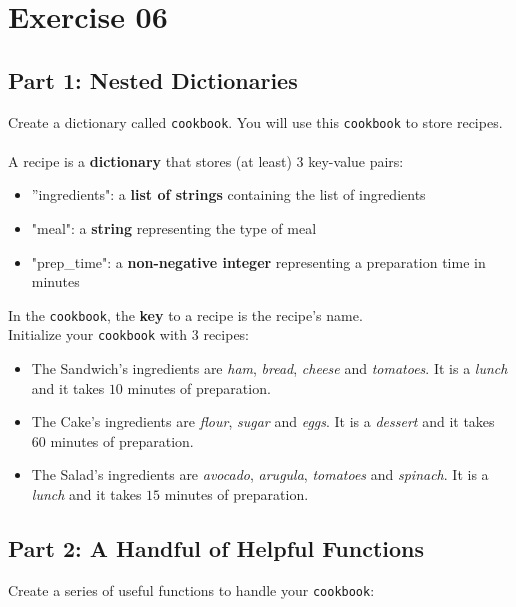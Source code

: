 \chapter{Exercise 06}
\makeheaderfilesforbidden

\section*{Part 1: Nested Dictionaries}

Create a dictionary called \texttt{cookbook}. You will use this \texttt{cookbook} to store recipes.
\\\\
A recipe is a \textbf{dictionary} that stores (at least) 3 key-value pairs:
\begin{itemize}
	\item ''ingredients": a \textbf{list of strings} containing the list of ingredients
	\item "meal": a \textbf{string} representing the type of meal
	\item "prep\_time": a \textbf{non-negative integer} representing a preparation time in minutes
\end{itemize}
In the \texttt{cookbook}, the  \textbf{key} to a recipe is the recipe's name.
\\
Initialize your \texttt{cookbook} with 3 recipes:
\begin{itemize}
	\item The Sandwich's ingredients are \textit{ham}, \textit{bread}, \textit{cheese} and \textit{tomatoes}.
It is a \textit{lunch} and it takes $10$ minutes of preparation.
	\item The Cake's ingredients are \textit{flour}, \textit{sugar} and \textit{eggs}.
It is a \textit{dessert} and it takes $60$ minutes of preparation.
	\item The Salad's ingredients are \textit{avocado}, \textit{arugula}, \textit{tomatoes} and \textit{spinach}.
It is a \textit{lunch} and it takes $15$ minutes of preparation.
\end{itemize}

\newpage
\section*{Part 2: A Handful of Helpful Functions}

Create a series of useful functions to handle your \texttt{cookbook}:


